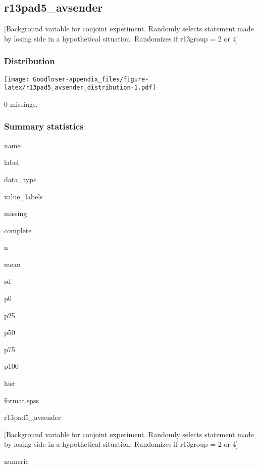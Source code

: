 \documentclass[]{book}
\begin{document}
\subsection{r13pad5\_avsender}\label{r13pad5_avsender}

{[}Background variable for conjoint experiment. Randomly selects
statement made by losing side in a hypothetical situation. Randomizes if
r13group = 2 or 4{]}

\subsubsection{Distribution}\label{r13pad5_avsender_distribution}

\texttt{[image: Goodloser-appendix\_files/figure-latex/r13pad5\_avsender\_distribution-1.pdf]}

0 missings.

\subsubsection{Summary statistics}\label{r13pad5_avsender_summary}

name

label

data\_type

value\_labels

missing

complete

n

mean

sd

p0

p25

p50

p75

p100

hist

format.spss

r13pad5\_avsender

{[}Background variable for conjoint experiment. Randomly selects
statement made by losing side in a hypothetical situation. Randomizes if
r13group = 2 or 4{]}

numeric
\end{document}
